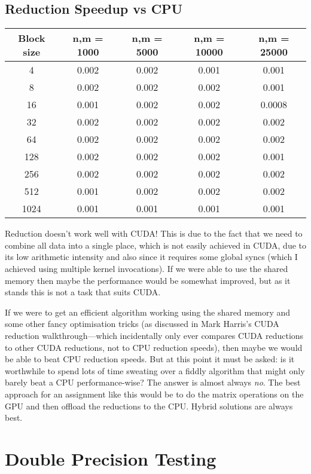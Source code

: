 \documentclass[a4paper, fleqn]{article}
\begin{document}
\subsection{Reduction Speedup vs CPU}%
\begin{center}
 \begin{tabular}{||c | c | c | c | c ||}
 \hline
 Block size & n,m = 1000 & n,m = 5000 & n,m = 10000 & n,m = 25000 \\ [0.5ex] 
 \hline
 4 & 0.002 & 0.002 & 0.001 & 0.001 \\
 \hline
 8 & 0.002 & 0.002 & 0.002 & 0.001 \\
 \hline
 16 & 0.001 & 0.002 & 0.002 & 0.0008 \\
 \hline
 32 & 0.002 & 0.002 & 0.002 & 0.002 \\
 \hline
 64 & 0.002 & 0.002 & 0.002 & 0.002 \\
 \hline
 128 & 0.002 & 0.002 & 0.002 & 0.001 \\
 \hline
 256 & 0.002 & 0.002 & 0.002 & 0.002 \\
 \hline
 512 & 0.001 & 0.002 & 0.002 & 0.002 \\
 \hline
 1024 & 0.001 & 0.001 & 0.001 & 0.001 \\
 \hline
\end{tabular}
\end{center}
Reduction doesn't work well with CUDA! This is due to the fact that we need to combine all data into a single place, which is not easily achieved in CUDA, due to its low arithmetic intensity and also since it requires some global syncs (which I achieved using multiple kernel invocations). If we were able to use the shared memory then maybe the performance would be somewhat improved, but as it stands this is not a task that suits CUDA.

If we were to get an efficient algorithm working using the shared memory and some other fancy optimisation tricks (as discussed in Mark Harris's CUDA reduction walkthrough---which incidentally only ever compares CUDA reductions to other CUDA reductions, not to CPU reduction speeds), then maybe we would be able to beat CPU reduction speeds. But at this point it must be asked: is it worthwhile to spend lots of time sweating over a fiddly algorithm that might only barely beat a CPU performance-wise? The answer is almost always \emph{no}. The best approach for an assignment like this would be to do the matrix operations on the GPU and then offload the reductions to the CPU. Hybrid solutions are always best.

\section{Double Precision Testing}%
\end{document}
